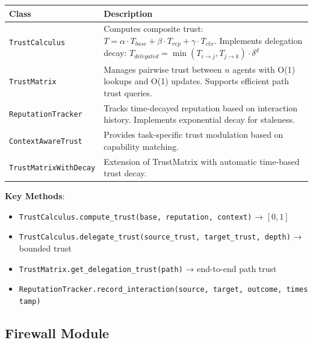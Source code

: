 \documentclass[
]{article}
\newcounter{none} %
\providecommand{\tightlist}{%
  \setlength{\itemsep}{0pt}\setlength{\parskip}{0pt}}
\begin{document}
{\def\LTcaptype{none} %
\begin{longtable}[]{@{}
  >{\raggedright\arraybackslash}p{}
  >{\raggedright\arraybackslash}p{}@{}}
\toprule\noalign{}
\begin{minipage}[b]{\linewidth}\raggedright
Class
\end{minipage} & \begin{minipage}[b]{\linewidth}\raggedright
Description
\end{minipage} \\
\midrule\noalign{}
\endhead
\bottomrule\noalign{}
\endlastfoot
\texttt{TrustCalculus} & Computes composite trust:
\(T = \alpha \cdot T_{base} + \beta \cdot T_{rep} + \gamma \cdot T_{ctx}\).
Implements delegation decay:
\(T_{delegated} = \min(T_{i \to j}, T_{j \to k}) \cdot \delta^d\) \\
\texttt{TrustMatrix} & Manages pairwise trust between \(n\) agents with
O(1) lookups and O(1) updates. Supports efficient path trust queries. \\
\texttt{ReputationTracker} & Tracks time-decayed reputation based on
interaction history. Implements exponential decay for staleness. \\
\texttt{ContextAwareTrust} & Provides task-specific trust modulation
based on capability matching. \\
\texttt{TrustMatrixWithDecay} & Extension of TrustMatrix with automatic
time-based trust decay. \\
\end{longtable}
}

\textbf{Key Methods}:

\begin{itemize}
\tightlist
\item
  \texttt{TrustCalculus.compute\_trust(base,\ reputation,\ context)} →
  \([0, 1]\)
\item
  \texttt{TrustCalculus.delegate\_trust(source\_trust,\ target\_trust,\ depth)}
  → bounded trust
\item
  \texttt{TrustMatrix.get\_delegation\_trust(path)} → end-to-end path
  trust
\item
  \texttt{ReputationTracker.record\_interaction(source,\ target,\ outcome,\ timestamp)}
\end{itemize}

\subsection{Firewall Module}\label{sec:firewall-api}
\end{document}
